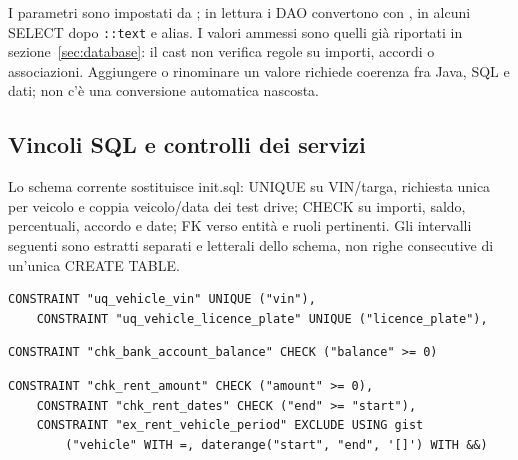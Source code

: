 I parametri sono impostati da ; in lettura i DAO
convertono con , in alcuni SELECT dopo \texttt{::text}
e alias. I valori ammessi sono quelli già riportati in
sezione~\ref{sec:database}: il cast non verifica regole su importi,
accordi o associazioni. Aggiungere o rinominare un valore richiede
coerenza fra Java, SQL e dati; non c'è una conversione automatica nascosta.


\subsection{Vincoli SQL e controlli dei servizi}\label{sec:impl-vincoli}
Lo schema corrente sostituisce init.sql: UNIQUE su VIN/targa, richiesta
unica per veicolo e coppia veicolo/data dei test drive; CHECK su importi,
saldo, percentuali, accordo e date; FK verso entità e ruoli pertinenti.
Gli intervalli seguenti sono estratti separati e letterali dello schema,
non righe consecutive di un'unica CREATE TABLE.

\noindent\begin{minipage}{\linewidth}
\begin{lstlisting}[firstnumber=90,gobble=4,caption={Due UNIQUE di vehicle, estratto dalla definizione della tabella.},label=lst:vincolo-vin]
    CONSTRAINT "uq_vehicle_vin" UNIQUE ("vin"),
    CONSTRAINT "uq_vehicle_licence_plate" UNIQUE ("licence_plate"),
\end{lstlisting}
\end{minipage}

\noindent\begin{minipage}{\linewidth}
\begin{lstlisting}[firstnumber=195,gobble=4,caption={CHECK saldo, estratto dalla definizione di bank\_account.},label=lst:vincolo-saldo]
    CONSTRAINT "chk_bank_account_balance" CHECK ("balance" >= 0)
\end{lstlisting}
\end{minipage}

\noindent\begin{minipage}{\linewidth}
\begin{lstlisting}[firstnumber=289,gobble=4,caption={CHECK importo e date ed esclusione GiST degli intervalli inclusi.},label=lst:vincolo-rent]
    CONSTRAINT "chk_rent_amount" CHECK ("amount" >= 0),
    CONSTRAINT "chk_rent_dates" CHECK ("end" >= "start"),
    CONSTRAINT "ex_rent_vehicle_period" EXCLUDE USING gist
        ("vehicle" WITH =, daterange("start", "end", '[]') WITH &&)
\end{lstlisting}
\end{minipage}

